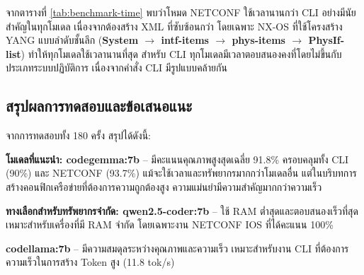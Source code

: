 \hspace*{1.3em}
จากตารางที่ \ref{tab:benchmark-time} พบว่าโหมด NETCONF ใช้เวลานานกว่า CLI อย่างมีนัยสำคัญในทุกโมเดล เนื่องจากต้องสร้าง XML ที่ซับซ้อนกว่า โดยเฉพาะ NX-OS ที่ใช้โครงสร้าง YANG แบบลำดับชั้นลึก (\textbf{System $\rightarrow$ intf-items $\rightarrow$ phys-items $\rightarrow$ PhysIf-list}) ทำให้ทุกโมเดลใช้เวลานานที่สุด สำหรับ CLI ทุกโมเดลมีเวลาตอบสนองคงที่โดยไม่ขึ้นกับประเภทระบบปฏิบัติการ เนื่องจากคำสั่ง CLI มีรูปแบบคล้ายกัน

\subsection{สรุปผลการทดสอบและข้อเสนอแนะ}
\hspace*{1.3em}
จากการทดสอบทั้ง 180 ครั้ง สรุปได้ดังนี้:

\hspace*{1.3em}
\textbf{โมเดลที่แนะนำ: \textbf{codegemma:7b}} -- มีคะแนนคุณภาพสูงสุดเฉลี่ย 91.8\% ครอบคลุมทั้ง CLI (90\%) และ NETCONF (93.7\%) แม้จะใช้เวลาและทรัพยากรมากกว่าโมเดลอื่น แต่ในบริบทการสร้างคอนฟิกเครือข่ายที่ต้องการความถูกต้องสูง ความแม่นยำมีความสำคัญมากกว่าความเร็ว

\hspace*{1.3em}
\textbf{ทางเลือกสำหรับทรัพยากรจำกัด: \textbf{qwen2.5-coder:7b}} -- ใช้ RAM ต่ำสุดและตอบสนองเร็วที่สุด เหมาะสำหรับเครื่องที่มี RAM จำกัด โดยเฉพาะงาน NETCONF IOS ที่ได้คะแนน 100\%

\hspace*{1.3em}
\textbf{\textbf{codellama:7b}} -- มีความสมดุลระหว่างคุณภาพและความเร็ว เหมาะสำหรับงาน CLI ที่ต้องการความเร็วในการสร้าง Token สูง (11.8 tok/s)






































